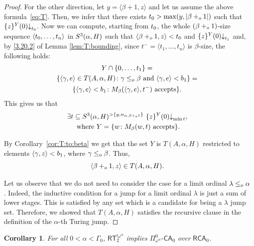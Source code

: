 \documentclass[11pt]{amsart}
\newtheorem{corollary}[thm]{Corollary}
\theoremstyle{definition}
\theoremstyle{remark}
\theoremstyle{plain}
\def\la{\langle}
\def\ra{\rangle}
\def\a{\alpha}
\newcommand{\RCA}{\mathsf{RCA}_0}
\newcommand{\RT}{\mathsf{RT}}
\newcommand{\CA}{\mathsf{\text{-}CA}_0}
\newcommand{\set}[1]{{\{{#1}\}}}
\def\stops{{\downarrow}}
\def\WO{{\textrm{WO}}}
\newcommand{\leqo}{\leq\sb{o}}
\newcommand{\pluso}{+\sb{o}}
\def\stops{{\downarrow}}
\newcommand{\lorenzo}[1]{\textcolor{blue}{#1}}
\begin{document}
\begin{proof}
For the other direction, let $y=\la\beta + 1,z\ra$ and let us assume the above formula~\eqref{eq:T}. 
Then, we infer that there exists $t\sb 0>\max(y,|\beta \pluso 1|)$ such that $\{z\}\sp{Y}(0)\stops\sb{t\sb 0}$.
Now we can compute, starting from $t\sb 0$, the whole $(\beta \pluso 1)$-size sequence $\langle t\sb0,\dots,t\sb n\rangle$ in $S\sp3(\alpha,H)$ such that $\langle\beta \pluso 1,z\rangle<t\sb 0$ and $\{z\}\sp{Y}(0)\stops\sb{t\sb 1}$ and, by \ref{3.20.2} of Lemma \ref{lem:T:bounding}, since $t^- = \langle t_1, \dots, t_n \rangle$ is $\beta$-size, the following holds: 
\begin{multline*}
Y\cap\set{0,\dots, t_1}=\\
\set{\langle\gamma,e\rangle\in T(A,\alpha,H)\colon \gamma\leqo\beta\mbox{ and } \langle\gamma,e\rangle<b\sb 1} =\\
\set{\langle\gamma,e\rangle<b\sb 1 \colon M\sb\beta(\langle\gamma,e\rangle,t^-)\mbox{ accepts}} .
\end{multline*}
This gives us that 
\begin{multline*}
\exists t \subseteq S\sp3(\alpha,H)\sp{>\set{y,n_{\a,\beta \pluso 1}}}\ 
\{z\}\sp{Y}(0)\stops\sb{ \min t},\\ \mbox{ where }  Y=\set{w\colon M\sb\beta(w, t)\mbox{ accepts}}. 
\end{multline*}

By Corollary~\ref{cor:T:to:beta} we get that the set $Y$ is $T(A,\alpha,H)$ restricted to elements $\langle \gamma,z\rangle<b\sb 1$, where $\gamma\leqo\beta$. 
Thus, 
$$
\la\beta\pluso1,z\ra\in T(A,\alpha,H).
$$

Let us observe that we do not need to consider the case for a limit ordinal $\lambda\leqo\alpha$. 
Indeed, the inductive condition for a jump for a limit ordinal $\lambda$ is just a sum of lower stages. 
This is satisfied by any set which is a candidate for being 
a $\lambda$ jump set.
Therefore, we showed that $T(A,\alpha,H)$ satisfies the recursive clause in the definition of the $\a$-th Turing jump. 
\end{proof}



\begin{corollary}\label{lowboundtj}
For all $0 < \alpha  < \Gamma_0$, $\RT^{!\omega^\alpha}_2$ implies $\Pi^0_{\omega^\alpha} \CA$ over $\RCA$.
\end{corollary}
\end{document}
